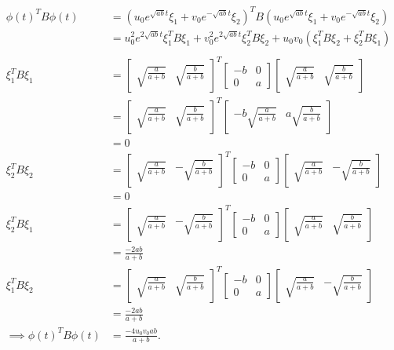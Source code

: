 \documentclass[12pt]{article}
\begin{document}
\begin{align*}
  \phi(t)^TB\phi(t)&= 
    (u_0e^{\sqrt{ab}t}\xi_1+v_0e^{-\sqrt{ab}t}\xi_2)^TB
    (u_0e^{\sqrt{ab}t}\xi_1+v_0e^{-\sqrt{ab}t}\xi_2)\\
		   &= u_0^2e^{2\sqrt{ab}t}\xi_1^T B\xi_1+v_0^2e^{2\sqrt{ab}t}\xi_2^TB\xi_2 + u_0v_0(\xi_1^T B \xi_2 + \xi_2^T B \xi_1)\\\\
  \xi_1^T B\xi_1 &= \begin{bmatrix}\sqrt{\frac{a}{a+b}}&\sqrt{\frac{b}{a+b}}\end{bmatrix}^T\begin{bmatrix}-b & 0\\
    0 & a\end{bmatrix}\begin{bmatrix}\sqrt{\frac{a}{a+b}} & \sqrt{\frac{b}{a+b}}\end{bmatrix}\\
      &= \begin{bmatrix}\sqrt{\frac{a}{a+b}} & \sqrt{\frac{b}{a+b}}\end{bmatrix}^T\begin{bmatrix}-b\sqrt{\frac{a}{a+b}} & a\sqrt{\frac{b}{a+b}}\end{bmatrix}\\
      &=0\\
\xi_2^T B\xi_2 &= \begin{bmatrix}\sqrt{\frac{a}{a+b}}&-\sqrt{\frac{b}{a+b}}\end{bmatrix}^T\begin{bmatrix}-b & 0\\
    0 & a\end{bmatrix}\begin{bmatrix}\sqrt{\frac{a}{a+b}} & -\sqrt{\frac{b}{a+b}}\end{bmatrix}\\
      &=0\\
    \xi_2^TB\xi_1&=\begin{bmatrix}\sqrt{\frac{a}{a+b}}&-\sqrt{\frac{b}{a+b}}\end{bmatrix}^T\begin{bmatrix}-b & 0\\
    0 & a\end{bmatrix}\begin{bmatrix}\sqrt{\frac{a}{a+b}}&\sqrt{\frac{b}{a+b}}\end{bmatrix}\\
      &= \frac{-2ab}{a+b}\\
    \xi_1^TB\xi_2&=\begin{bmatrix}\sqrt{\frac{a}{a+b}}&\sqrt{\frac{b}{a+b}}\end{bmatrix}^T\begin{bmatrix}-b & 0\\0 & a\end{bmatrix}\begin{bmatrix}\sqrt{\frac{a}{a+b}}&-\sqrt{\frac{b}{a+b}}\end{bmatrix}\\ 
&= \frac{-2ab}{a+b}\\
\implies
    \phi(t)^TB\phi(t)&= \frac{-4u_0v_0ab}{a+b}.
\end{align*}
\end{document}
